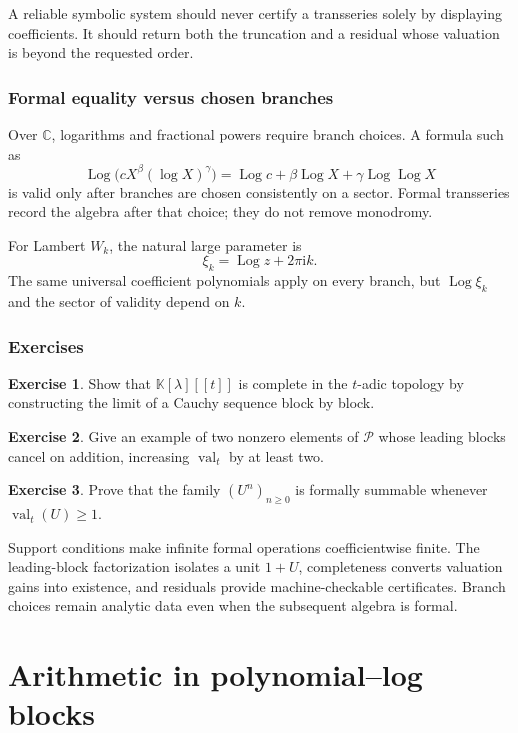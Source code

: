 \documentclass[11pt,openany]{book}
\theoremstyle{definition}
\newtheorem{exercise}{Exercise}[chapter]
\theoremstyle{plain}
\theoremstyle{remark}
\newcommand{\C}{\mathbb{C}}
\newcommand{\K}{\mathbb{K}}
\newcommand{\Plog}{\mathscr{P}}
\newcommand{\ii}{\mathrm{i}}
\DeclareMathOperator{\val}{val}
\DeclareMathOperator{\Log}{Log}
\begin{document}
\begin{algorithmicbox}
A reliable symbolic system should never certify a transseries solely by displaying coefficients. It should return both the truncation and a residual whose valuation is beyond the requested order.
\end{algorithmicbox}

\section{Formal equality versus chosen branches}
Over \(\C\), logarithms and fractional powers require branch choices. A formula such as
\[
 \Log\bigl(cX^\beta(\log X)^\gamma\bigr)
 =\Log c+\beta\Log X+\gamma\Log\Log X
\]
is valid only after branches are chosen consistently on a sector. Formal transseries record the algebra after that choice; they do not remove monodromy.

For Lambert \(W_k\), the natural large parameter is
\[
 \xi_k=\Log z+2\pi\ii k.
\]
The same universal coefficient polynomials apply on every branch, but \(\Log\xi_k\) and the sector of validity depend on \(k\).

\section{Exercises}
\begin{exercise}
Show that \(\K[\lambda][[t]]\) is complete in the \(t\)-adic topology by constructing the limit of a Cauchy sequence block by block.
\end{exercise}
\begin{exercise}
Give an example of two nonzero elements of \(\Plog\) whose leading blocks cancel on addition, increasing \(\val_t\) by at least two.
\end{exercise}
\begin{exercise}
Prove that the family \((U^n)_{n\ge0}\) is formally summable whenever \(\val_t(U)\ge1\).
\end{exercise}

\begin{summarybox}
Support conditions make infinite formal operations coefficientwise finite. The leading-block factorization isolates a unit \(1+U\), completeness converts valuation gains into existence, and residuals provide machine-checkable certificates. Branch choices remain analytic data even when the subsequent algebra is formal.
\end{summarybox}

\part{Arithmetic in polynomial--log blocks}\label{part:arithmetic}
\end{document}
